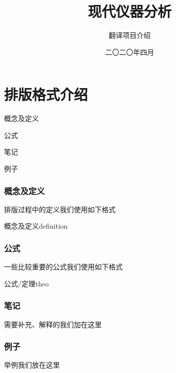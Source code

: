 \documentclass[cn,11pt,chinese]{elegantbook}
\title{现代仪器分析}
\subtitle{翻译项目介绍}
\date{二〇二〇年四月}
\begin{document}
\maketitle
\frontmatter


\vskip 1.5cm

\tableofcontents

\mainmatter
\chapter{排版格式介绍}
\begin{introduction}
    \item 概念及定义
    \item 公式
    \item 笔记
    \item 例子
\end{introduction}

\subsection{概念及定义}
排版过程中的定义我们使用如下格式
\begin{definition}{概念及定义}{definition}
    
\end{definition}

\subsection{公式}
一些比较重要的公式我们使用如下格式
\begin{theorem}{公式/定理}{theo}
    
\end{theorem}

\subsection{笔记}
\note 需要补充、解释的我们加在这里

\subsection{例子}
\begin{example}
    举例我们放在这里
\end{example}
\end{document}
